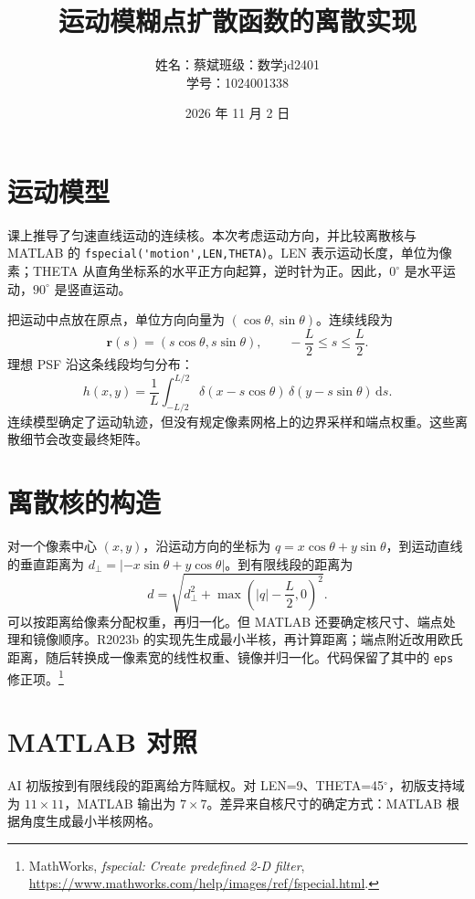 \documentclass[UTF8,12pt,a4paper]{ctexart}
\title{运动模糊点扩散函数的离散实现}
\author{姓名：蔡斌\quad 班级：数学jd2401\\[4pt]
学号：1024001338}
\date{2026 年 11 月 2 日}
\begin{document}
\maketitle

\section{运动模型}
课上推导了匀速直线运动的连续核。本次考虑运动方向，并比较离散核与 MATLAB 的
\lstinline|fspecial('motion',LEN,THETA)|。LEN 表示运动长度，单位为像素；THETA 从直角坐标系的水平正方向起算，逆时针为正。因此，$0^\circ$ 是水平运动，$90^\circ$ 是竖直运动。

把运动中点放在原点，单位方向向量为 $(\cos\theta,\sin\theta)$。连续线段为
\begin{equation}
  \mathbf r(s)=(s\cos\theta,s\sin\theta),\qquad -\frac{L}{2}\le s\le \frac{L}{2}.
\end{equation}
理想 PSF 沿这条线段均匀分布：
\begin{equation}
 h(x,y)=\frac{1}{L}\int_{-L/2}^{L/2}
 \delta(x-s\cos\theta)\,\delta(y-s\sin\theta)\,\mathrm ds.
\end{equation}
连续模型确定了运动轨迹，但没有规定像素网格上的边界采样和端点权重。这些离散细节会改变最终矩阵。

\section{离散核的构造}
对一个像素中心 $(x,y)$，沿运动方向的坐标为 $q=x\cos\theta+y\sin\theta$，到运动直线的垂直距离为 $d_{\perp}=|-x\sin\theta+y\cos\theta|$。到有限线段的距离为
\begin{equation}
 d=\sqrt{d_{\perp}^{2}+\max\left(|q|-\frac{L}{2},0\right)^2}.
\end{equation}
可以按距离给像素分配权重，再归一化。但 MATLAB 还要确定核尺寸、端点处理和镜像顺序。R2023b 的实现先生成最小半核，再计算距离；端点附近改用欧氏距离，随后转换成一像素宽的线性权重、镜像并归一化。代码保留了其中的 \texttt{eps} 修正项。\footnote{MathWorks, \emph{fspecial: Create predefined 2-D filter}, \url{https://www.mathworks.com/help/images/ref/fspecial.html}.}

\section{MATLAB 对照}
AI 初版按到有限线段的距离给方阵赋权。对 LEN=9、THETA=45$^\circ$，初版支持域为 $11\times11$，MATLAB 输出为 $7\times7$。差异来自核尺寸的确定方式：MATLAB 根据角度生成最小半核网格。
\end{document}
